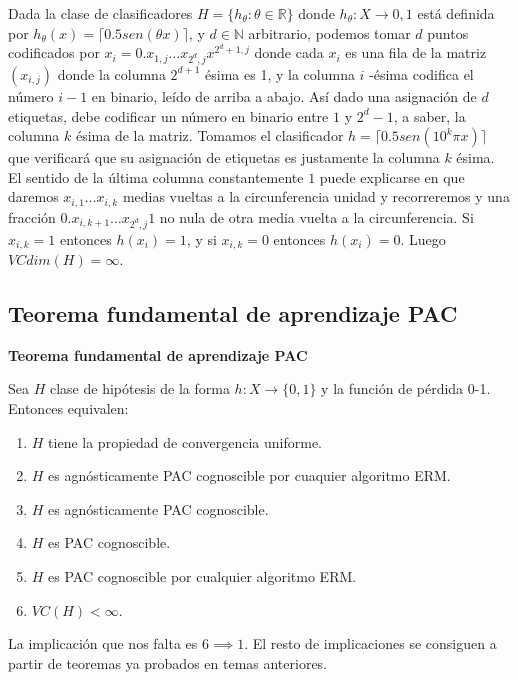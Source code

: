 Dada la clase de clasificadores $H = \{h_{\theta}: \theta \in \mathbb{R}\}$ donde 
$h_{\theta}: X \rightarrow {0,1}$ está definida por $h_\theta (x) = \lceil 0.5 sen(\theta x) \rceil$, y 
$d\in \mathbb{N}$ arbitrario, podemos tomar $d$ puntos codificados por $x_i = 0.x_{1,j} \ldots x_{2^d,j} x^{2^d + 1,j}$ 
donde cada $x_{i}$ es una fila de la matriz $(x_{i,j})$ donde la columna $2^{d+1}$ ésima es 1, y la columna 
$i$ -ésima codifica el número $i-1$ en binario, leído de arriba a abajo. Así dado una asignación de $d$ 
etiquetas, debe codificar un número en binario entre $1$ y $2^d-1$, a saber, la columna $k$ ésima de la 
matriz. Tomamos el clasificador $h = \lceil 0.5 sen(10^k \pi x) \rceil$ que verificará que su asignación de 
etiquetas es justamente la columna $k$ ésima. El sentido de la última columna constantemente $1$ puede 
explicarse en que daremos $x_{i,1} \ldots x_{i,k}$ medias vueltas a la circunferencia unidad y recorreremos 
y una fracción $0.x_{i,k+1} \ldots x_{2^d,j} 1$ no nula de otra media vuelta a la circunferencia. Si 
$x_{i,k} = 1$ entonces $h(x_i) = 1$, y si $x_{i,k}=0$ entonces $h(x_i) = 0$. Luego $VCdim(H) = \infty$.

\subsection{Teorema fundamental de aprendizaje PAC}

\begin{theorem}
\textbf{Teorema fundamental de aprendizaje PAC}

Sea $H$ clase de hipótesis de la forma $h: X \rightarrow \{0,1\}$ y la función de pérdida 0-1. Entonces equivalen:

\begin{enumerate}
\item $H$ tiene la propiedad de convergencia uniforme.
\item $H$ es agnósticamente PAC cognoscible por cuaquier algoritmo ERM.
\item $H$ es agnósticamente PAC cognoscible.
\item $H$ es PAC cognoscible.
\item $H$ es PAC cognoscible por cualquier algoritmo ERM.
\item $VC (H) < \infty$.
\end{enumerate}
\end{theorem}


La implicación que nos falta es $6 \implies 1$. El resto de implicaciones se consiguen a partir de teoremas ya probados en temas anteriores.

